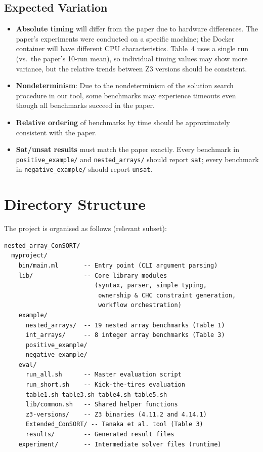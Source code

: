 \documentclass[a4paper,USenglish]{darts-v2021}
\begin{document}
\subsection{Expected Variation}

\begin{itemize}
  \item \textbf{Absolute timing} will differ from the paper due to hardware differences.
        The paper's experiments were conducted on a specific machine; the Docker
        container will have different CPU characteristics. Table~4 uses a single
        run (vs.\ the paper's 10-run mean), so individual timing values may show
        more variance, but the relative trends between Z3 versions should be
        consistent.
  \item \textbf{Nondeterminism}: Due to the nondeterminism of the solution
        search procedure in our tool, some benchmarks may experience timeouts
        even though all benchmarks succeed in the paper.
  \item \textbf{Relative ordering} of benchmarks by time should be approximately
        consistent with the paper.
  \item \textbf{Sat/unsat results} must match the paper exactly. Every benchmark
        in \texttt{positive\_example/} and \texttt{nested\_arrays/} should
        report \texttt{sat}; every benchmark in \texttt{negative\_example/}
        should report \texttt{unsat}.
\end{itemize}


\section{Directory Structure}

The project is organised as follows (relevant subset):

\begin{verbatim}
nested_array_ConSORT/
  myproject/
    bin/main.ml       -- Entry point (CLI argument parsing)
    lib/              -- Core library modules
                         (syntax, parser, simple typing,
                          ownership & CHC constraint generation,
                          workflow orchestration)
    example/
      nested_arrays/  -- 19 nested array benchmarks (Table 1)
      int_arrays/     -- 8 integer array benchmarks (Table 3)
      positive_example/
      negative_example/
    eval/
      run_all.sh      -- Master evaluation script
      run_short.sh    -- Kick-the-tires evaluation
      table1.sh table3.sh table4.sh table5.sh
      lib/common.sh   -- Shared helper functions
      z3-versions/    -- Z3 binaries (4.11.2 and 4.14.1)
      Extended_ConSORT/ -- Tanaka et al. tool (Table 3)
      results/        -- Generated result files
    experiment/       -- Intermediate solver files (runtime)
\end{verbatim}
\end{document}
